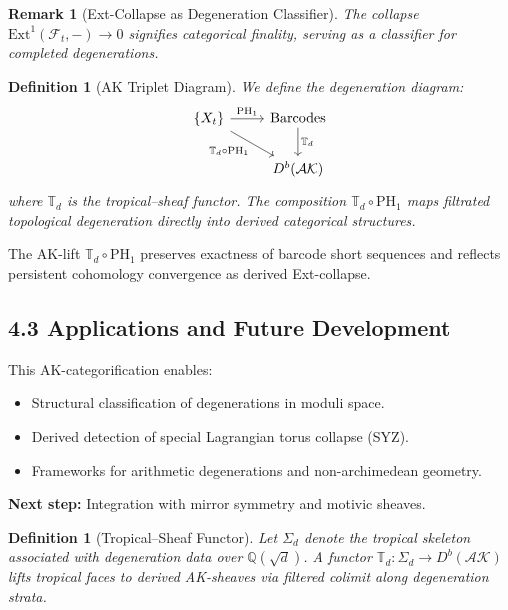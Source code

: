 \documentclass[11pt]{article}
\newtheorem{definition}[theorem]{Definition}
\newtheorem{remark}[theorem]{Remark}
\begin{document}
\begin{remark}[Ext-Collapse as Degeneration Classifier]
The collapse \( \mathrm{Ext}^1(\mathcal{F}_t, -) \to 0 \) signifies categorical finality, serving as a classifier for completed degenerations.
\end{remark}

\begin{definition}[AK Triplet Diagram]
We define the degeneration diagram:
\[
\begin{tikzcd}
\{X_t\} \arrow[r, "\mathrm{PH}_1"] \arrow[dr, swap, "\mathbb{T}_d \circ \mathrm{PH}_1"] & \text{Barcodes} \arrow[d, "\mathbb{T}_d"] \\
& D^b(\mathcal{AK})
\end{tikzcd}
\]
where $\mathbb{T}_d$ is the tropical--sheaf functor. The composition $\mathbb{T}_d \circ \mathrm{PH}_1$ maps filtrated topological degeneration directly into derived categorical structures.
\end{definition}

\begin{lemma}
The AK-lift $\mathbb{T}_d \circ \mathrm{PH}_1$ preserves exactness of barcode short sequences and reflects persistent cohomology convergence as derived Ext-collapse.
\end{lemma}

\subsection{4.3 Applications and Future Development}

This AK-categorification enables:
\begin{itemize}
    \item Structural classification of degenerations in moduli space.
    \item Derived detection of special Lagrangian torus collapse (SYZ).
    \item Frameworks for arithmetic degenerations and non-archimedean geometry.
\end{itemize}

\textbf{Next step:} Integration with mirror symmetry and motivic sheaves.

\begin{definition}[Tropical--Sheaf Functor]
Let $\Sigma_d$ denote the tropical skeleton associated with degeneration data over $\mathbb{Q}(\sqrt{d})$.
A functor $\mathbb{T}_d : \Sigma_d \to D^b(\mathcal{AK})$ lifts tropical faces to derived AK-sheaves via filtered colimit along degeneration strata.
\end{definition}
\end{document}
